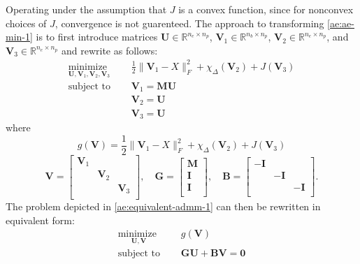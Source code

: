 Operating under the assumption that $J$ is a convex function, since for nonconvex choices of $J$, convergence is not guarenteed. The approach to transforming \eqref{ae:ae-min-1} is to first introduce matrices $\mathbf{U} \in \mathbb{R}^{n_e \times n_p}$, $\mathbf{V}_1 \in \mathbb{R}^{n_b \times n_p}$, $\mathbf{V}_2 \in \mathbb{R}^{n_e \times n_p}$, and $\mathbf{V}_{3} \in \mathbb{R}^{n_e \times n_p}$ and rewrite as follows:
\begin{equation}
    \label{ae:equivalent-admm-1}
    \begin{aligned}
        \underset{\mathbf{U}, \mathbf{V}_1, \mathbf{V}_2, \mathbf{V}_3}{\text{minimize }} & \quad \frac{1}{2} \|\mathbf{V}_1 - X \|_F^2 + \chi_{\Delta}(\mathbf{V}_2) + J(\mathbf{V}_3) 
        \\         
        \text{subject to } &  \quad \mathbf{V}_1 = \mathbf{MU} \\
        & \quad \mathbf{V}_2 = \mathbf{U} \\
        & \quad \mathbf{V}_{3} = \mathbf{U}
   \end{aligned}
\end{equation}
where
$$g(\mathbf{V}) = \frac{1}{2} \|\mathbf{V}_1 - X \|_F^2 + \chi_{\Delta}(\mathbf{V}_2) + J(\mathbf{V}_3)$$
$$
\mathbf{V} = \begin{bmatrix}
\mathbf{V}_1 &  &   \\
 &\mathbf{V}_2&   \\
  &  & \mathbf{V}_3 \\
\end{bmatrix},
\quad
\mathbf{G} = 
\begin{bmatrix}
\mathbf{M}\\ 
\mathbf{I}\\ 
\mathbf{I}\\ 
\end{bmatrix},
\quad
\mathbf{B} = 
\begin{bmatrix}
-\mathbf{I} &  &  \\
  &-\mathbf{I}&  \\
&  & -\mathbf{I} \\
\end{bmatrix}.
$$
The problem depicted in \eqref{ae:equivalent-admm-1} can then be rewritten in equivalent form:
\begin{equation}
    \label{ae:equivalent-admm-2}
    \begin{aligned}
        \underset{\mathbf{U},\mathbf{V}}{\text{minimize }} & \quad g(\mathbf{V})
        \\         
        \text{subject to } &  \quad \mathbf{GU} + \mathbf{BV} = \mathbf{0}
   \end{aligned}
\end{equation}
